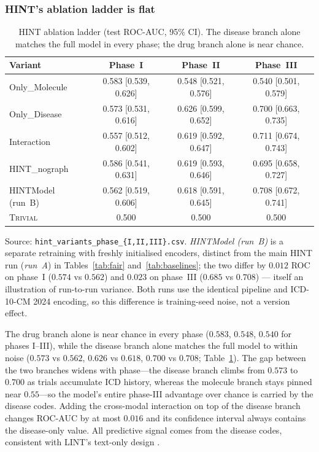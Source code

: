 \documentclass[a4paper,fleqn]{cas-sc}
\begin{document}
\subsubsection{HINT's ablation ladder is flat}
\label{sec:ablation}
\begin{table}[t]
\centering
\small
\caption{HINT ablation ladder (test ROC-AUC, 95\% CI). The disease branch alone matches the full model in every phase; the drug branch alone is near chance.}
\label{tab:ablation}
\begin{tabular}{lccc}
\toprule
Variant & Phase~I & Phase~II & Phase~III \\
\midrule
Only\_Molecule & 0.583 {\scriptsize [0.539, 0.626]} & 0.548 {\scriptsize [0.521, 0.576]} & 0.540 {\scriptsize [0.501, 0.579]} \\
Only\_Disease & 0.573 {\scriptsize [0.531, 0.616]} & 0.626 {\scriptsize [0.599, 0.652]} & 0.700 {\scriptsize [0.663, 0.735]} \\
Interaction & 0.557 {\scriptsize [0.512, 0.602]} & 0.619 {\scriptsize [0.592, 0.647]} & 0.711 {\scriptsize [0.674, 0.743]} \\
HINT\_nograph & 0.586 {\scriptsize [0.541, 0.631]} & 0.619 {\scriptsize [0.593, 0.646]} & 0.695 {\scriptsize [0.658, 0.727]} \\
HINTModel (run~B) & 0.562 {\scriptsize [0.519, 0.606]} & 0.618 {\scriptsize [0.591, 0.645]} & 0.708 {\scriptsize [0.672, 0.741]} \\
\textsc{Trivial} & 0.500 & 0.500 & 0.500 \\
\bottomrule
\end{tabular}
\begin{minipage}{\linewidth}\vspace{2pt}\scriptsize Source: \texttt{hint\_variants\_phase\_\{I,II,III\}.csv}. \emph{HINTModel (run~B)} is a separate retraining with freshly initialised encoders, distinct from the main HINT run (\emph{run~A}) in Tables~\ref{tab:fair} and~\ref{tab:baselines}; the two differ by $0.012$ ROC on phase~I ($0.574$ vs $0.562$) and $0.023$ on phase~III ($0.685$ vs $0.708$) --- itself an illustration of run-to-run variance. Both runs use the identical pipeline and ICD-10-CM 2024 encoding, so this difference is training-seed noise, not a version effect. \end{minipage}
\end{table}
The drug branch alone is near chance in every phase ($0.583$, $0.548$, $0.540$ for phases
I--III), while the disease branch alone matches the full model to within noise ($0.573$ vs
$0.562$, $0.626$ vs $0.618$, $0.700$ vs $0.708$; Table~\ref{tab:ablation}). The gap between
the two branches widens with phase---the disease branch climbs from $0.573$ to $0.700$ as
trials accumulate ICD history, whereas the molecule branch stays pinned near $0.55$---so the
model's entire phase-III advantage over chance is carried by the disease codes. Adding the
cross-modal interaction on top of the disease branch changes ROC-AUC by at most $0.016$ and
its confidence interval always contains the disease-only value. All predictive signal comes
from the disease codes, consistent with LINT's text-only design \citep{gao2024lint}.
\end{document}
